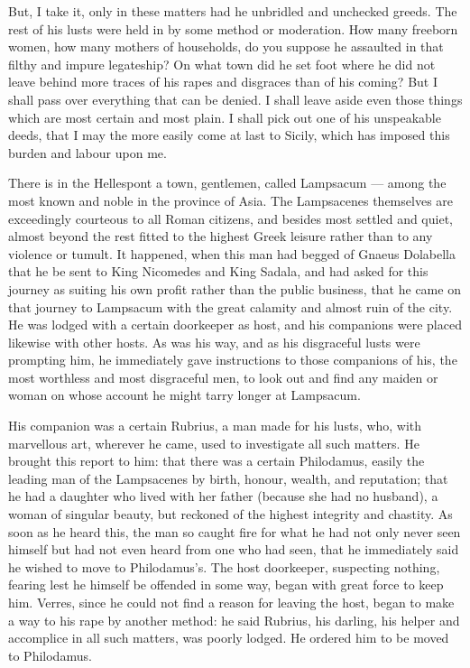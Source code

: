  But, I take it, only in these matters had he unbridled and unchecked greeds. The rest of his lusts were held in by some method or moderation. How many freeborn women, how many mothers of households, do you suppose he assaulted in that filthy and impure legateship? On what town did he set foot where he did not leave behind more traces of his rapes and disgraces than of his coming? But I shall pass over everything that can be denied. I shall leave aside even those things which are most certain and most plain. I shall pick out one of his unspeakable deeds, that I may the more easily come at last to Sicily, which has imposed this burden and labour upon me.

 There is in the Hellespont a town, gentlemen, called Lampsacum --- among the most known and noble in the province of Asia. The Lampsacenes themselves are exceedingly courteous to all Roman citizens, and besides most settled and quiet, almost beyond the rest fitted to the highest Greek leisure rather than to any violence or tumult. It happened, when this man had begged of Gnaeus Dolabella that he be sent to King Nicomedes and King Sadala, and had asked for this journey as suiting his own profit rather than the public business, that he came on that journey to Lampsacum with the great calamity and almost ruin of the city. He was lodged with a certain doorkeeper as host, and his companions were placed likewise with other hosts. As was his way, and as his disgraceful lusts were prompting him, he immediately gave instructions to those companions of his, the most worthless and most disgraceful men, to look out and find any maiden or woman on whose account he might tarry longer at Lampsacum.

 His companion was a certain Rubrius, a man made for his lusts, who, with marvellous art, wherever he came, used to investigate all such matters. He brought this report to him: that there was a certain Philodamus, easily the leading man of the Lampsacenes by birth, honour, wealth, and reputation; that he had a daughter who lived with her father (because she had no husband), a woman of singular beauty, but reckoned of the highest integrity and chastity. As soon as he heard this, the man so caught fire for what he had not only never seen himself but had not even heard from one who had seen, that he immediately said he wished to move to Philodamus's. The host doorkeeper, suspecting nothing, fearing lest he himself be offended in some way, began with great force to keep him. Verres, since he could not find a reason for leaving the host, began to make a way to his rape by another method: he said Rubrius, his darling, his helper and accomplice in all such matters, was poorly lodged. He ordered him to be moved to Philodamus.

